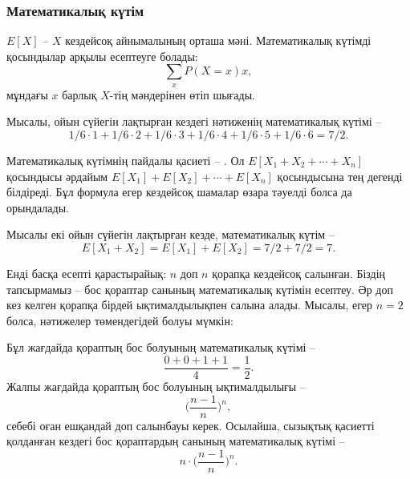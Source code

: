 \subsubsection{Математикалық күтім}


 $E[X]$ -- $X$
кездейсоқ айнымалының орташа мәні. 
Математикалық күтімді қосындылар арқылы 
есептеуге болады: 
\[\sum_x P(X=x)x,\]
мұндағы $x$ барлық $X$-тің мәндерінен өтіп шығады. 

Мысалы, ойын сүйегін лақтырған кездегі 
нәтиженің математикалық күтімі -- 
\[1/6 \cdot 1 + 1/6 \cdot 2 + 1/6 \cdot 3 + 1/6 \cdot 4 + 1/6 \cdot 5 + 1/6 \cdot 6 = 7/2.\]

Математикалық күтімнің пайдалы қасиеті --
. Ол 
$E[X_1+X_2+\cdots+X_n]$ қосындысы 
әрдайым 
$E[X_1]+E[X_2]+\cdots+E[X_n]$ қосындысына тең дегенді білдіреді. 
Бұл формула егер кездейсоқ шамалар өзара тәуелді болса
да орындалады. 

Мысалы екі ойын сүйегін лақтырған кезде,
математикалық күтім --
\[E[X_1+X_2]=E[X_1]+E[X_2]=7/2+7/2=7.\]

Енді басқа есепті қарастырайық:
$n$ доп $n$ қорапқа кездейсоқ салынған. 
Біздің тапсырмамыз -- бос қораптар санының 
математикалық күтімін есептеу. Әр доп 
кез келген қорапқа бірдей ықтималдылықпен салына алады.
Мысалы, егер $n=2$ болса, нәтижелер төмендегідей болуы мүмкін:
\begin{center}
\end{center}
Бұл жағдайда қораптың бос болуының математикалық
күтімі --
\[\frac{0+0+1+1}{4} = \frac{1}{2}.\]
Жалпы жағдайда қораптың бос болуының ықтималдылығы --
\[\Big(\frac{n-1}{n}\Big)^n,\]
себебі оған ешқандай доп салынбауы керек.
Осылайша, сызықтық қасиетті қолданған кездегі 
бос қораптардың санының математикалық күтімі --
\[n \cdot \Big(\frac{n-1}{n}\Big)^n.\]

